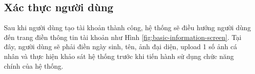\subsection{Xác thực người dùng}





Sau khi người dùng tạo tài khoản thành công, hệ thống sẽ điều hướng người dùng đến trang điền thông tin tài khoản như Hình \ref{fig:basic-information-screen}. Tại đây, người dùng sẽ phải điền ngày sinh, tên, ảnh đại diện, upload 1 số ảnh cá nhân và thực hiện khảo sát hệ thống trước khi tiến hành sử dụng chức năng chính của hệ thống.

